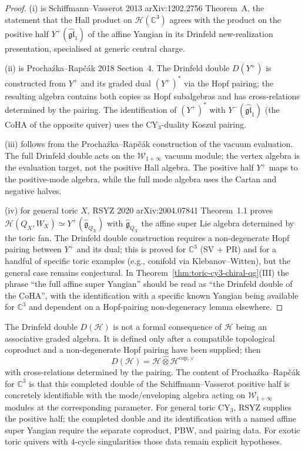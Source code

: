 \begin{proof}
(i) is Schiffmann--Vasserot 2013 \textup{arXiv:1202.2756} Theorem~A,
the statement that the Hall product on $\mathcal{H}(\mathbb{C}^3)$
agrees with the product on the positive half
$Y^+(\widehat{\mathfrak{gl}}_1)$ of the affine Yangian in its Drinfeld
new-realization presentation, specialised at generic central charge.

(ii) is Procha\'zka--Rap\v{c}\'ak 2018 Section~4. The Drinfeld double
$D(Y^+)$ is constructed from $Y^+$ and its graded dual $(Y^+)^*$ via
the Hopf pairing; the resulting algebra contains both copies as
Hopf subalgebras and has cross-relations determined by the pairing.
The identification of $(Y^+)^*$ with $Y^-(\widehat{\mathfrak{gl}}_1)$
(the CoHA of the opposite quiver) uses the CY$_3$-duality
Koszul pairing.

(iii) follows from the Procha\'zka--Rap\v{c}\'ak construction of the
vacuum evaluation. The full Drinfeld double acts on the
$\mathcal{W}_{1+\infty}$ vacuum module; the vertex algebra is the
evaluation target, not the positive Hall algebra. The positive half
$Y^+$ maps to the positive-mode algebra, while the full mode algebra
uses the Cartan and negative halves.

(iv) for general toric $X$, RSYZ 2020 \textup{arXiv:2004.07841}
Theorem~1.1 proves
$\mathcal{H}(Q_X, W_X) \simeq Y^+(\widehat{\mathfrak{g}}_{Q_X})$ with
$\widehat{\mathfrak{g}}_{Q_X}$ the affine super Lie algebra determined
by the toric fan. The Drinfeld double construction requires a
non-degenerate Hopf pairing between $Y^+$ and its dual; this is proved
for $\mathbb{C}^3$ (SV + PR) and for a handful of specific toric
examples (e.g., conifold via Klebanov--Witten), but the general case
remains conjectural. In
Theorem~\ref{thm:toric-cy3-chiral-qg}(III) the phrase ``the full
affine super Yangian'' should be read as ``the Drinfeld double of the
CoHA'', with the identification with a specific known Yangian being
available for $\mathbb{C}^3$ and dependent on a Hopf-pairing
non-degeneracy lemma elsewhere.
\end{proof}

\begin{remark}
\label{rem:drinfeld-double-content}
The Drinfeld double $D(\mathcal{H})$ is not a formal consequence of
$\mathcal{H}$ being an associative graded algebra. It is defined only
after a compatible topological coproduct and a non-degenerate Hopf
pairing have been supplied; then
\[
 D(\mathcal{H})
 =
 \mathcal{H}\widehat{\otimes}\mathcal{H}^{\mathrm{cop},\vee}
\]
with cross-relations determined by the pairing. The content of
Procha\'zka--Rap\v{c}\'ak for $\mathbb{C}^3$ is that this completed
double of the Schiffmann--Vasserot positive half is concretely
identifiable with the mode/enveloping algebra acting on
$\mathcal{W}_{1+\infty}$ modules at the corresponding parameter. For
general toric CY$_3$, RSYZ supplies the positive half; the completed
double and its identification with a named affine super Yangian require
the separate coproduct, PBW, and pairing data. For exotic toric quivers
with $4$-cycle singularities those data remain explicit hypotheses.
\end{remark}

